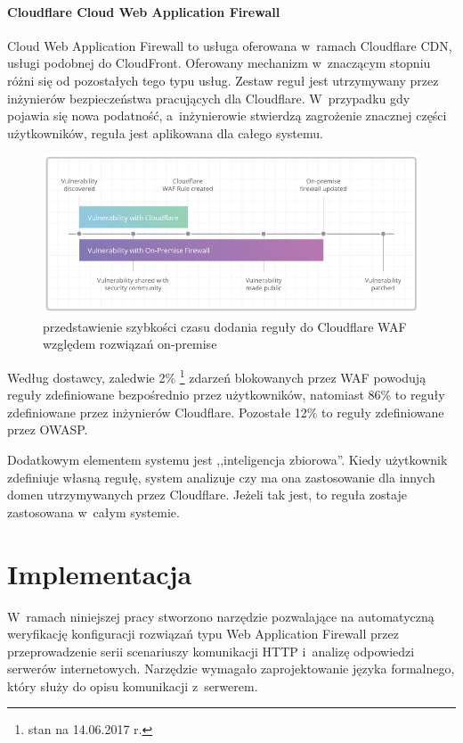\documentclass[12pt,a4paper,polish,thesis]{dcsbook}
\begin{document}
\subsubsection{Cloudflare Cloud Web Application Firewall}
Cloud Web Application Firewall to usługa oferowana w~ramach Cloudflare CDN, usługi podobnej do CloudFront. Oferowany mechanizm w~znaczącym stopniu różni się od pozostałych tego typu usług. Zestaw reguł jest utrzymywany przez inżynierów bezpieczeństwa pracujących dla Cloudflare. W~przypadku gdy pojawia się nowa podatność, a~inżynierowie stwierdzą zagrożenie znacznej części użytkowników, reguła jest aplikowana dla całego systemu.

\begin{figure}[h]
\centering
\includegraphics[scale=0.7]{cloudflare}

\caption{przedstawienie szybkości czasu dodania reguły do Cloudflare WAF względem rozwiązań on-premise \cite{cloudflarewaf}}
\label{fig:cloudflare}
\end{figure}

Według dostawcy, zaledwie 2\% \footnote{stan na 14.06.2017 r.} zdarzeń blokowanych przez WAF powodują reguły zdefiniowane bezpośrednio przez użytkowników, natomiast 86\% to reguły zdefiniowane przez inżynierów Cloudflare. Pozostałe 12\% to reguły zdefiniowane przez OWASP.

Dodatkowym elementem systemu jest ,,inteligencja zbiorowa''. Kiedy użytkownik zdefiniuje własną regułę, system analizuje czy ma ona zastosowanie dla innych domen utrzymywanych przez Cloudflare. Jeżeli tak jest, to reguła zostaje zastosowana w~całym systemie.



\chapter{Implementacja}
 W~ramach niniejszej pracy stworzono narzędzie pozwalające na automatyczną weryfikację konfiguracji rozwiązań typu Web Application Firewall przez przeprowadzenie serii scenariuszy komunikacji HTTP i~analizę odpowiedzi serwerów internetowych. Narzędzie wymagało zaprojektowanie języka formalnego, który służy do opisu komunikacji z~serwerem. 
\end{document}
